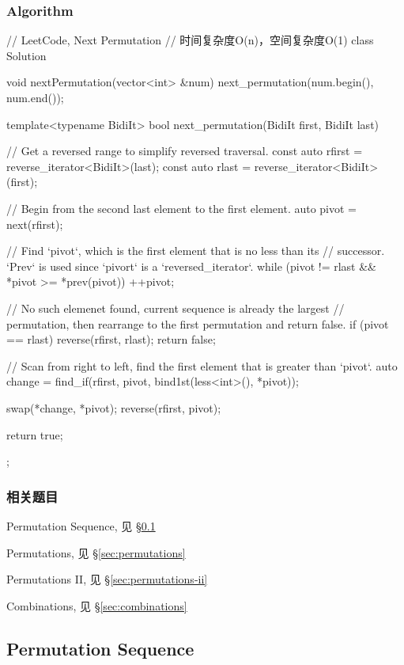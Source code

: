 \subsubsection{Algorithm}
\begin{Code}
	// LeetCode, Next Permutation
	// 时间复杂度O(n)，空间复杂度O(1)
	class Solution {
		void nextPermutation(vector<int> &num) {
			next_permutation(num.begin(), num.end());
		}
		
		template<typename BidiIt>
		bool next_permutation(BidiIt first, BidiIt last) {
			// Get a reversed range to simplify reversed traversal.
			const auto rfirst = reverse_iterator<BidiIt>(last);
			const auto rlast = reverse_iterator<BidiIt>(first);
			
			// Begin from the second last element to the first element.
			auto pivot = next(rfirst);
			
			// Find `pivot`, which is the first element that is no less than its
			// successor.  `Prev` is used since `pivort` is a `reversed_iterator`.
			while (pivot != rlast && *pivot >= *prev(pivot))
			++pivot;
			
			// No such elemenet found, current sequence is already the largest
			// permutation, then rearrange to the first permutation and return false.
			if (pivot == rlast) {
				reverse(rfirst, rlast);
				return false;
			}
			
			// Scan from right to left, find the first element that is greater than `pivot`.
			auto change = find_if(rfirst, pivot, bind1st(less<int>(), *pivot));
			
			swap(*change, *pivot);
			reverse(rfirst, pivot);
			
			return true;
		}
	};
\end{Code}


\subsubsection{相关题目}
\begindot
\item Permutation Sequence, 见 \S \ref{sec:permutation-sequence}
\item Permutations, 见 \S \ref{sec:permutations}
\item Permutations II, 见 \S \ref{sec:permutations-ii}
\item Combinations, 见 \S \ref{sec:combinations}
\myenddot


\subsection{Permutation Sequence} %
\label{sec:permutation-sequence}


